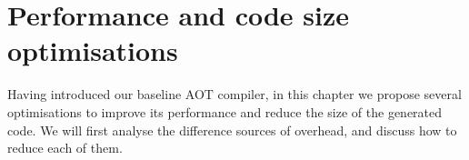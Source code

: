 \chapter{Performance and code size optimisations}
\label{sec-optimisations}
Having introduced our baseline AOT compiler, in this chapter we propose several optimisations to improve its performance and reduce the size of the generated code. We will first analyse the difference sources of overhead, and discuss how to reduce each of them.

